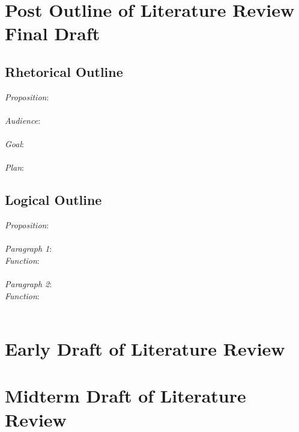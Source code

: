 \documentclass[12pt]{article}
\begin{document}
\newpage
\section{Post Outline of Literature Review Final Draft}
\subsection*{Rhetorical Outline}
\noindent \textit{Proposition}: \\ \\
\textit{Audience}: \\ \\
\textit{Goal}: \\ \\
\textit{Plan}: 

\subsection*{Logical Outline}
\noindent \textit{Proposition}: \\ \\
\textit{Paragraph 1}: \\
\indent \textit{Function}: \\ \\
\textit{Paragraph 2}: \\
\indent \textit{Function}: \\ \\



\newpage
\section{Early Draft of Literature Review}

%
%


\newpage

\section{Midterm Draft of Literature Review}

%
%
\end{document}
